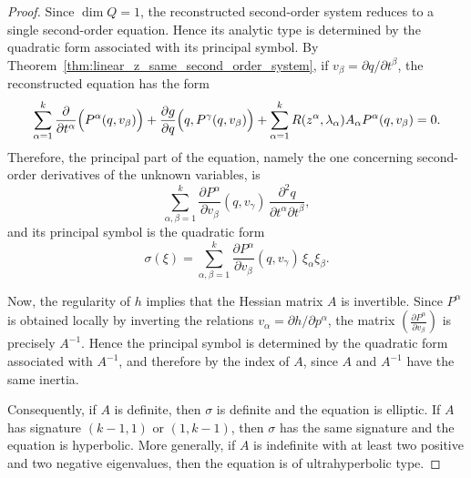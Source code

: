 \documentclass[10pt,a4paper]{amsart}
\begin{document}
\begin{proof}
Since \(\dim Q=1\), the reconstructed second-order system reduces to a single second-order equation. Hence its analytic type is determined by the quadratic form associated with its principal symbol. By Theorem~\ref{thm:linear_z_same_second_order_system}, if \(v_\beta=\partial q/\partial t^\beta\), the reconstructed equation has the form
\[
\sum_{\alpha=1}^k \frac{\partial}{\partial t^\alpha}\Bigl(P^\alpha(q,v_\beta)\Bigr)
+\frac{\partial g}{\partial q}\Bigl(q,P^\gamma(q,v_\beta)\Bigr)
+\sum_{\alpha=1}^k R(z^\alpha,\lambda_\alpha)A_\alpha P^\alpha(q,v_\beta)=0.
\]
Therefore, the principal part of the equation, namely the one concerning second-order derivatives of the unknown variables, is
\[
\sum_{\alpha,\beta=1}^k \frac{\partial P^\alpha}{\partial v_\beta}(q,v_\gamma)\,
\frac{\partial^2 q}{\partial t^\alpha\partial t^\beta},
\]
and its principal symbol is the quadratic form
\[
\sigma(\xi)=\sum_{\alpha,\beta=1}^k \frac{\partial P^\alpha}{\partial v_\beta}(q,v_\gamma)\,\xi_\alpha\xi_\beta.
\]

Now, the regularity of \(h\) implies that the Hessian matrix
$A$
is invertible. Since \(P^\alpha\) is obtained locally by inverting the relations \(v_\alpha=\partial h/\partial p^\alpha\), the matrix
\(
\left(\frac{\partial P^\alpha}{\partial v_\beta}\right)
\)
is precisely \(A^{-1}\). Hence the principal symbol is determined by the quadratic form associated with \(A^{-1}\), and therefore by the index of \(A\), since \(A\) and \(A^{-1}\) have the same inertia.

Consequently, if \(A\) is definite, then \(\sigma\) is definite and the equation is elliptic. If \(A\) has signature \((k-1,1)\) or \((1,k-1)\), then \(\sigma\) has the same signature and the equation is hyperbolic. More generally, if \(A\) is indefinite with at least two positive and two negative eigenvalues, then the equation is of ultrahyperbolic type.  


\end{proof}
\end{document}
